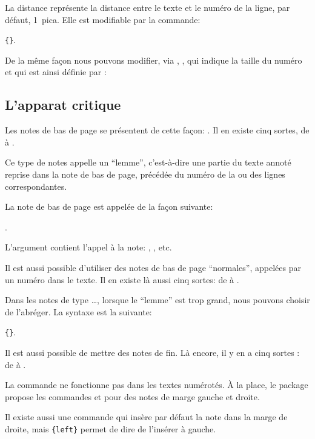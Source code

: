 La distance  représente la distance entre le texte et le numéro de la ligne, par défaut, 1~pica. 
Elle est  modifiable par la commande:

\verb|{|\verb|}|. 

De la même façon nous pouvons modifier, via , , qui indique la taille du numéro et qui est ainsi définie par :

\begin{latexcode}
\newcommand{\numlabfont}{\normalfont\scriptsize}
\end{latexcode}
 

\subsection{L'apparat critique}

Les notes de bas de page se présentent de cette façon:  . Il en existe cinq sortes, de  à .


Ce type de notes appelle un \enquote{lemme}, c'est-à-dire une partie du texte annoté reprise dans la note de bas de page, précédée du numéro de la ou des lignes correspondantes. 

La note de bas de page est appelée de la façon suivante:  

. 

L'argument  contient l'appel à la note: , , etc.

Il est aussi possible d'utiliser  des  notes de bas de page \enquote{normales}, appelées par un numéro dans le texte. Il  en existe là aussi cinq sortes: de  à .

Dans les notes de type \dots, lorsque le \enquote{lemme} est trop grand, nous pouvons choisir de l'abréger. La syntaxe est la suivante: 

\verb|{|\verb|}|. 

\begin{plusloins}
Il est aussi possible de mettre des notes de fin. Là encore, il y en a cinq sortes :  de  à .

La commande  ne fonctionne pas dans les textes numérotés. À la place, le package propose les commandes  et  pour des notes de marge gauche et droite.

Il existe aussi une commande  qui insère par défaut la note dans la marge de droite, mais \verb={left}= permet de dire de l'insérer à gauche.
\end{plusloins} 

